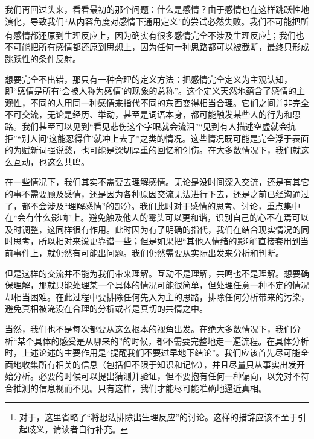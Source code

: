 \divider

我们再回过头来，看看最初的那个问题：什么是感情？由于感情也在这样跳跃性地演化，导致我们“从内容角度对感情下通用定义”的尝试必然失败。我们不可能把所有感情都还原到生理反应上，因为确实有很多感情完全不涉及生理反应\footnote{对于\rigorous，这里省略了“将想法排除出生理反应”的讨论。这样的措辞应该不至于引起歧义，请读者自行补充。}；我们也不可能把所有感情都还原到思想上，因为任何一种思路都可以被截断，最终只形成跳跃性的条件反射。

想要完全不出错，那只有一种合理的定义方法：把感情完全定义为主观认知，即“感情是所有‘会被人称为感情’的现象的总称”。这个定义天然地蕴含了感情的主观性，不同的人用同一种感情来指代不同的东西变得相当合理。它们之间并非完全不可交流，无论是经历、举动，甚至是词语本身，都可能触发某些人的行为和思路。我们甚至可以见到“看见悲伤这个字眼就会流泪”“见到有人描述空虚就会抗拒”“别人问‘这能忍得住’就冲上去了”之类的情况。这些情况既可能是完全浮于表面的为赋新词强说愁，也可能是深切厚重的回忆和创伤。在大多数情况下，我们就这么互动，也这么共鸣。

在一些情况下，我们其实不需要去理解感情。无论是没时间深入交流，还是有其它的事不需要顾及感情，还是因为各种原因交流无法进行下去，还是之前已经沟通过了，都不会涉及“理解感情”的部分。我们此时对于感情的思考、讨论，重点集中在“会有什么影响”上。避免触及他人的霉头可以更和谐，识别自己的心不在焉可以及时调整，这同样很有作用。此时因为有了明确的指代，我们在结合现实情况的同时思考，所以相对来说更靠谱一些；但是如果把“其他人情绪的影响”直接套用到当前事件上，就仍然有可能出问题。我们仍然需要从实际出发来分析和判断。

但是这样的交流并不能为我们带来理解。互动不是理解，共鸣也不是理解。想要确保理解，那就只能处理某一个具体的情况可能很简单，但处理任意一种不定的情况却相当困难。在此过程中要排除任何先入为主的思路，排除任何分析带来的污染，避免真相被淹没在合理的分析或者是真切的共情之中。

当然，我们也不是每次都要从这么根本的视角出发。在绝大多数情况下，我们分析“某个具体的感受是从哪来的”的时候，都不需要完整地走一遍流程。在具体分析时，上述论述的主要作用是“提醒我们不要过早地下结论”。我们应该首先尽可能全面地收集所有相关的信息（包括但不限于知识和记忆），并且尽量只从事实出发开始分析。必要的时候可以提出猜测并验证，但不要抱有任何一种偏向，以免对不符合推测的信息视而不见。只有这样，我们才能尽可能准确地逼近真相。
